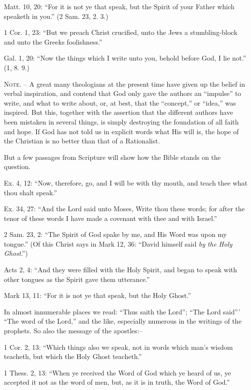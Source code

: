 \documentclass[
]{book}
\begin{document}
Matt. 10, 20: ``For it is not ye that speak, but the Spirit of your Father which speaketh in you.'' (2 Sam. 23, 2. 3.)

1 Cor. 1, 23: ``But we preach Christ crucified, unto the Jews a stumbling-block and unto the Greeks foolishness.''

Gal. 1, 20: ``Now the things which I write unto you, behold before God, I lie not.'' (1, 8. 9.)

\textsc{Note.} -- A great many theologians at the present time have given up the belief in verbal inspiration, and contend that God only gave the authors an ``impulse'' to write, and what to write about, or, at best, that the ``concept,'' or ``idea,'' was inspired. But this, together with the assertion that the different authors have been mistaken in several things, is simply destroying the foundation of all faith and hope. If God has not told us in explicit words what His will is, the hope of the Christian is no better than that of a Rationalist.

But a few passages from Scripture will show how the Bible stands on the question.

Ex. 4, 12: ``Now, therefore, go, and I will be with thy mouth, and teach thee what thou shalt speak.''

Ex. 34, 27: ``And the Lord said unto Moses, Write thou these words; for after the tenor of these words I have made a covenant with thee and with Israel.''

2 Sam. 23, 2: ``The Spirit of God spake by me, and His Word was upon my tongue.'' (Of this Christ says in Mark 12, 36: ``David himself said \emph{by the Holy Ghost}.'')

Acts 2, 4: ``And they were filled with the Holy Spirit, and began to speak with other tongues as the Spirit gave them utterance.''

Mark 13, 11: ``For it is not ye that speak, but the Holy Ghost.''

In almost innumerable places we read: ``Thus saith the Lord''; ``The Lord said''' ``The word of the Lord,'' and the like, especially numerous in the writings of the prophets. So also the message of the apostles:--

1 Cor. 2, 13: ``Which things also we speak, not in words which man's wisdom teacheth, but which the Holy Ghost teacheth.''

1 Thess. 2, 13: ``When ye received the Word of God which ye heard of us, ye accepted it not as the word of men, but, as it is in truth, the Word of God.''
\end{document}
